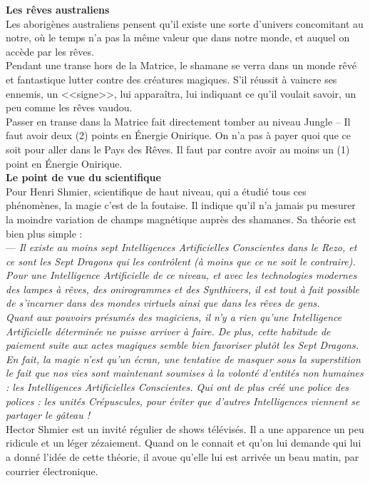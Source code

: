 \documentclass[11pt,twoside,a4paper]{article}
\begin{document}
\begin{multicols}{2}
{	\small
	\textbf{\large Les r{\^e}ves australiens}~\\
	Les aborig{\`e}nes australiens pensent qu'il existe une sorte d'univers concomitant au notre, o{\`u} le temps n'a pas la m{\^e}me valeur que dans notre monde, et auquel on acc{\`e}de par les r{\^e}ves. ~\\
	Pendant une transe hors de la Matrice, le shamane se verra dans un monde r{\^e}v{\'e} et fantastique lutter contre des cr{\'e}atures magiques. S'il r{\'e}ussit {\`a} vaincre ses ennemis, un <<signe>>, lui appara{\^i}tra, lui indiquant ce qu'il voulait savoir, un peu comme les r{\^e}ves vaudou. ~\\
	Passer en transe dans la Matrice fait directement tomber au niveau Jungle -- Il faut avoir deux (2) points en {\'E}nergie Onirique. On n'a pas {\`a} payer quoi que ce soit pour aller dans le Pays des R{\^e}ves. Il faut par contre avoir au moins un (1) point en {\'E}nergie Onirique. ~\\ 
	
	\textbf{\Large Le point de vue du scientifique}~\\
	Pour Henri Shmier, scientifique de haut niveau, qui a {\'e}tudi{\'e} tous ces ph{\'e}nom{\`e}nes, la magie c'est de la foutaise. Il indique qu'il n'a jamais pu mesurer la moindre variation de champs magn{\'e}tique aupr{\`e}s des shamanes. Sa th{\'e}orie est bien plus simple : ~\\
	--- \emph{Il existe au moins sept Intelligences Artificielles Conscientes dans le Rezo, et ce sont les Sept Dragons qui les contr{\^o}lent ({\`a} moins que ce ne soit le contraire). Pour une Intelligence Artificielle de ce niveau, et avec les technologies modernes des lampes {\`a} r{\^e}ves, des onirogrammes et des Synthivers, il est tout {\`a} fait possible de s'incarner dans des mondes virtuels ainsi que dans les r{\^e}ves de gens. } ~\\
	\emph{Quant aux pouvoirs pr{\'e}sum{\'e}s des magiciens, il n'y a rien qu'une Intelligence Artificielle d{\'e}termin{\'e}e ne puisse arriver {\`a} faire. De plus, cette habitude de paiement suite aux actes magiques semble bien favoriser plut{\^o}t les Sept Dragons. En fait, la magie n'est qu'un {\'e}cran, une tentative de masquer sous la superstition le fait que nos vies sont maintenant soumises {\`a} la volont{\'e} d'entit{\'e}s non humaines : les Intelligences Artificielles Conscientes. Qui ont de plus cr{\'e}{\'e} une police des polices : les unit{\'e}s Cr{\'e}puscules, pour {\'e}viter que d'autres Intelligences viennent se partager le g{\^a}teau !}~\\
	Hector Shmier est un invit{\'e} r{\'e}gulier de shows t{\'e}l{\'e}vis{\'e}s. Il a une apparence un peu ridicule et un l{\'e}ger z{\'e}zaiement. Quand on le connait et qu'on lui demande qui lui a donn{\'e} l'id{\'e}e de cette th{\'e}orie, il avoue qu'elle lui est arriv{\'e}e un beau matin, par courrier {\'e}lectronique. ~\\
			
}
\end{multicols}
\end{document}
